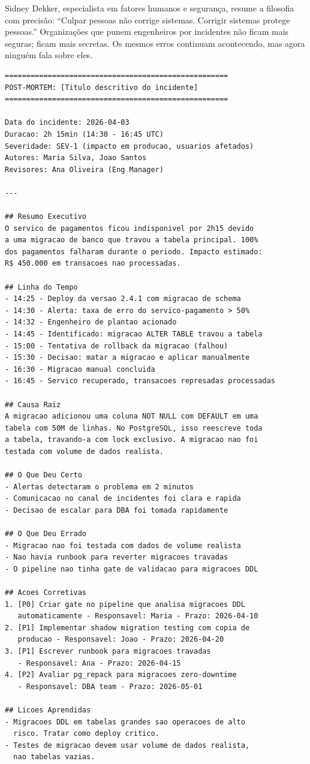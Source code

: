 Sidney Dekker, especialista em fatores humanos e segurança, resume a filosofia
com precisão: ``Culpar pessoas não corrige sistemas. Corrigir sistemas protege
pessoas.'' Organizações que punem engenheiros por incidentes não ficam mais
seguras; ficam mais secretas. Os mesmos erros continuam acontecendo, mas agora
ninguém fala sobre eles.

\begin{lstlisting}[language={}, caption={Template de Post-Mortem}]
====================================================
POST-MORTEM: [Titulo descritivo do incidente]
====================================================

Data do incidente: 2026-04-03
Duracao: 2h 15min (14:30 - 16:45 UTC)
Severidade: SEV-1 (impacto em producao, usuarios afetados)
Autores: Maria Silva, Joao Santos
Revisores: Ana Oliveira (Eng Manager)

---

## Resumo Executivo
O servico de pagamentos ficou indisponivel por 2h15 devido
a uma migracao de banco que travou a tabela principal. 100%
dos pagamentos falharam durante o periodo. Impacto estimado:
R$ 450.000 em transacoes nao processadas.

## Linha do Tempo
- 14:25 - Deploy da versao 2.4.1 com migracao de schema
- 14:30 - Alerta: taxa de erro do servico-pagamento > 50%
- 14:32 - Engenheiro de plantao acionado
- 14:45 - Identificado: migracao ALTER TABLE travou a tabela
- 15:00 - Tentativa de rollback da migracao (falhou)
- 15:30 - Decisao: matar a migracao e aplicar manualmente
- 16:30 - Migracao manual concluida
- 16:45 - Servico recuperado, transacoes represadas processadas

## Causa Raiz
A migracao adicionou uma coluna NOT NULL com DEFAULT em uma
tabela com 50M de linhas. No PostgreSQL, isso reescreve toda
a tabela, travando-a com lock exclusivo. A migracao nao foi
testada com volume de dados realista.

## O Que Deu Certo
- Alertas detectaram o problema em 2 minutos
- Comunicacao no canal de incidentes foi clara e rapida
- Decisao de escalar para DBA foi tomada rapidamente

## O Que Deu Errado
- Migracao nao foi testada com dados de volume realista
- Nao havia runbook para reverter migracoes travadas
- O pipeline nao tinha gate de validacao para migracoes DDL

## Acoes Corretivas
1. [P0] Criar gate no pipeline que analisa migracoes DDL
   automaticamente - Responsavel: Maria - Prazo: 2026-04-10
2. [P1] Implementar shadow migration testing com copia de
   producao - Responsavel: Joao - Prazo: 2026-04-20
3. [P1] Escrever runbook para migracoes travadas
   - Responsavel: Ana - Prazo: 2026-04-15
4. [P2] Avaliar pg_repack para migracoes zero-downtime
   - Responsavel: DBA team - Prazo: 2026-05-01

## Licoes Aprendidas
- Migracoes DDL em tabelas grandes sao operacoes de alto
  risco. Tratar como deploy critico.
- Testes de migracao devem usar volume de dados realista,
  nao tabelas vazias.
\end{lstlisting}

